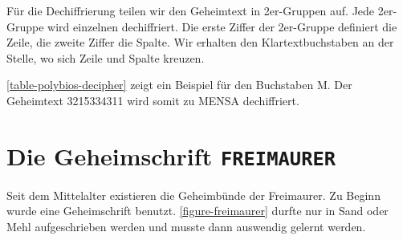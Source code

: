 Für die Dechiffrierung teilen wir den Geheimtext in \num{2}er-Gruppen auf. Jede \num{2}er-Gruppe wird einzelnen dechiffriert. Die erste Ziffer der \num{2}er-Gruppe definiert die Zeile, die zweite Ziffer die Spalte. Wir erhalten den Klartextbuchstaben an der Stelle, wo sich Zeile und Spalte kreuzen. 

\begin{example}
\autoref{table-polybios-decipher} zeigt ein Beispiel für den Buchstaben M. Der Geheimtext \num{32}\num{15}\num{33}\num{43}\num{11} wird somit zu MENSA dechiffriert.
\end{example}

\section{Die Geheimschrift \texttt{FREIMAURER}}

Seit dem Mittelalter existieren die Geheimbünde der Freimaurer. Zu Beginn wurde eine Geheimschrift benutzt. \autoref{figure-freimaurer} durfte nur in Sand oder Mehl aufgeschrieben werden und musste dann auswendig gelernt werden.

